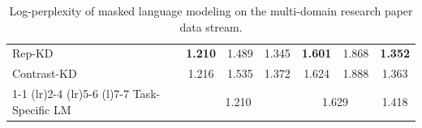 \begin{table}[]
{\begin{tabular}{@{}lcccccc@{}}
Rep-KD          & \textbf{1.210}                    &           1.489             &       1.345                   &                \textbf{1.601}                          &                    1.868                       &                           \textbf{1.352}                                \\
Contrast-KD     &         1.216             &          1.535             &       1.372             &            1.624                      &                    1.888                       &                    1.363                                        \\
\cmidrule(r){1-1} \cmidrule(lr){2-4} \cmidrule(lr){5-6} \cmidrule(l){7-7}                      
Task-Specific LM          & \multicolumn{3}{c}{1.210}                                                       & \multicolumn{2}{c}{1.629}                                                                  &   1.418                                                                \\ 
\bottomrule
\end{tabular}
}
\caption{Log-perplexity of masked language modeling on the multi-domain research paper data stream.}
\label{tab:academics_ppl}
\end{table}